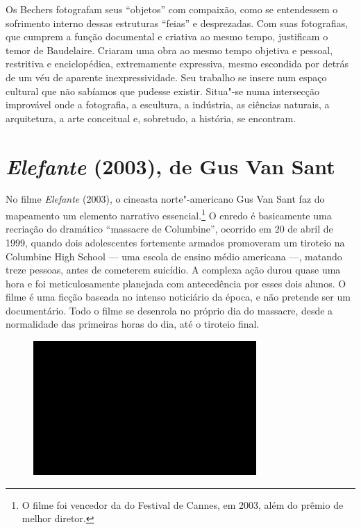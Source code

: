 Os Bechers fotografam seus ``objetos'' com compaixão, como se
entendessem o sofrimento interno dessas estruturas ``feias'' e
desprezadas. Com suas fotografias, que cumprem a função documental e
criativa ao mesmo tempo, justificam o temor de Baudelaire. Criaram uma
obra ao mesmo tempo objetiva e pessoal, restritiva e enciclopédica,
extremamente expressiva, mesmo escondida por detrás de um véu de
aparente inexpressividade. Seu trabalho se insere num espaço cultural
que não sabíamos que pudesse existir. Situa"-se numa intersecção
improvável onde a fotografia, a escultura, a indústria, as ciências
naturais, a arquitetura, a arte conceitual e, sobretudo, a história, se
encontram.

\chapter{\emph{Elefante} (2003), de Gus Van Sant}

No filme \emph{Elefante} (2003), o cineasta norte"-americano Gus Van Sant
faz do mapeamento um elemento narrativo essencial.\footnote{O filme foi
  vencedor da {} do Festival de Cannes, em 2003, além
  do prêmio de melhor diretor.} O enredo é basicamente uma recriação do
dramático ``massacre de Columbine'', ocorrido em 20 de abril de 1999,
quando dois adolescentes fortemente armados promoveram um tiroteio na
Columbine High School --- uma escola de ensino médio americana ---,
matando treze pessoas, antes de cometerem suicídio. A complexa ação
durou quase uma hora e foi meticulosamente planejada com antecedência
por esses dois alunos. O filme é uma ficção baseada no intenso
noticiário da época, e não pretende ser um documentário. Todo o filme se
desenrola no próprio dia do massacre, desde a normalidade das primeiras
horas do dia, até o tiroteio final.

\begin{figure}[!ht]

\centering
 \includegraphics[width=85mm]{./imgs/im1.jpg}
\caption{\tiny{}}

\end{figure}

